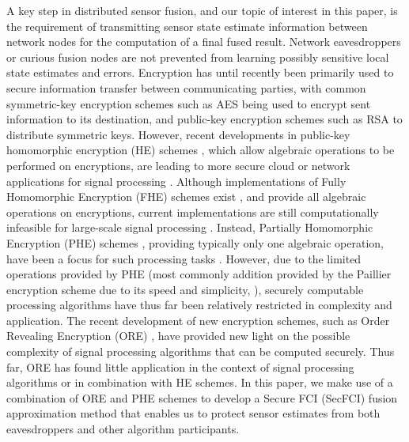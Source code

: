 \documentclass[letterpaper, 10 pt, conference]{ieeeconf}  %
\begin{document}
A key step in distributed sensor fusion, and our topic of interest in this paper, is the requirement of transmitting sensor state estimate information between network nodes for the computation of a final fused result. Network eavesdroppers or curious fusion nodes are not prevented from learning possibly sensitive local state estimates and errors. Encryption has until recently been primarily used to secure information transfer between communicating parties, with common symmetric-key encryption schemes such as AES \cite{AnnouncingAdvancedEncryption2001} being used to encrypt sent information to its destination, and public-key encryption schemes such as RSA \cite{rivestMethodObtainingDigital1978} to distribute symmetric keys. However, recent developments in public-key homomorphic encryption (HE) schemes \cite{gentryFullyHomomorphicEncryption2009,elgamalPublicKeyCryptosystem1985,paillierPublicKeyCryptosystemsBased1999}, which allow algebraic operations to be performed on encryptions, are leading to more secure cloud or network applications for signal processing \cite{lagendijkEncryptedSignalProcessing2013,alexandruEncryptedCooperativeControl,aristovEncryptedMultisensorInformation2018}. Although implementations of Fully Homomorphic Encryption (FHE) schemes exist \cite{gentryImplementingGentryFullyHomomorphic2011}, and provide all algebraic operations on encryptions, current implementations are still computationally infeasible for large-scale signal processing \cite{duImplementingMLAlgorithms,acarSurveyHomomorphicEncryption2018}. Instead, Partially Homomorphic Encryption (PHE) schemes \cite{elgamalPublicKeyCryptosystem1985,paillierPublicKeyCryptosystemsBased1999}, providing typically only one algebraic operation, have been a focus for such processing tasks \cite{alexandruEncryptedCooperativeControl,aristovEncryptedMultisensorInformation2018}. However, due to the limited operations provided by PHE (most commonly addition provided by the Paillier encryption scheme due to its speed and simplicity, \cite{paillierPublicKeyCryptosystemsBased1999}), securely computable processing algorithms have thus far been relatively restricted in complexity and application. The recent development of new encryption schemes, such as Order Revealing Encryption (ORE) \cite{chenettePracticalOrderRevealingEncryption2016,lewiOrderRevealingEncryptionNew2016,bogatovComparativeEvaluationOrderPreserving}, have provided new light on the possible complexity of signal processing algorithms that can be computed securely. Thus far, ORE has found little application in the context of signal processing algorithms or in combination with HE schemes. In this paper, we make use of a combination of ORE and PHE schemes to develop a Secure FCI (SecFCI) fusion approximation method that enables us to protect sensor estimates from both eavesdroppers and other algorithm participants.
\end{document}
